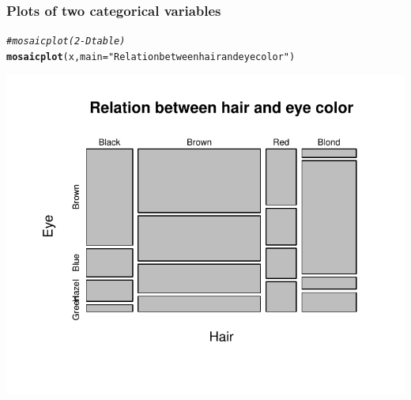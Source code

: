\documentclass[12pt]{beamer}\usepackage[]{graphicx}\usepackage[]{color}
\makeatletter
\newcommand{\hlstr}[1]{\textcolor[rgb]{0.192,0.494,0.8}{#1}}%
\newcommand{\hlcom}[1]{\textcolor[rgb]{0.678,0.584,0.686}{\textit{#1}}}%
\newcommand{\hlstd}[1]{\textcolor[rgb]{0.345,0.345,0.345}{#1}}%
\newcommand{\hlkwc}[1]{\textcolor[rgb]{0.333,0.667,0.333}{#1}}%
\newcommand{\hlkwd}[1]{\textcolor[rgb]{0.737,0.353,0.396}{\textbf{#1}}}%
\newenvironment{kframe}{%
 \def\at@end@of@kframe{}%
 \ifinner\ifhmode%
  \def\at@end@of@kframe{\end{minipage}}%
  \begin{minipage}{\columnwidth}%
 \fi\fi%
 \def\FrameCommand##1{\hskip\@totalleftmargin \hskip-\fboxsep
 \colorbox{shadecolor}{##1}\hskip-\fboxsep
     \hskip-\linewidth \hskip-\@totalleftmargin \hskip\columnwidth}%
 \MakeFramed {\advance\hsize-\width
   \@totalleftmargin\z@ \linewidth\hsize
   \@setminipage}}%
 {\par\unskip\endMakeFramed%
 \at@end@of@kframe}
\newenvironment{knitrout}{}{} %
\makeatother
\begin{document}

\begin{frame}[fragile]
\frametitle{Plots of two categorical variables}
\begin{knitrout}\footnotesize
{}\color{fgcolor}\begin{kframe}
\begin{alltt}
\hlcom{# mosaic plot (2-D table)}
\hlkwd{mosaicplot}\hlstd{(x,} \hlkwc{main} \hlstd{=} \hlstr{"Relation between hair and eye color"}\hlstd{)}
\end{alltt}
\end{kframe}

{\centering \includegraphics[width=.7\linewidth,height=.6\linewidth]{figure/unnamed-chunk-19-1} 

}



\end{knitrout}
\end{frame}

\end{document}
